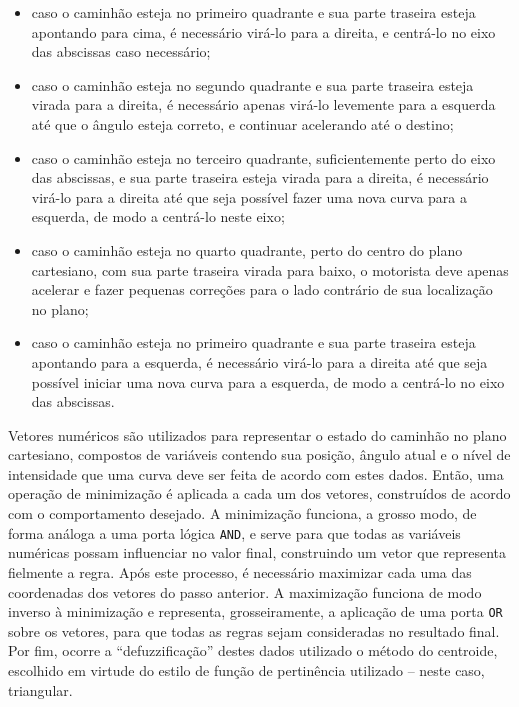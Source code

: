 \documentclass{article}
\begin{document}
\begin{itemize}

    \item caso o caminhão esteja no primeiro quadrante e sua parte traseira
        esteja apontando para cima, é necessário virá-lo para a direita, e
        centrá-lo no eixo das abscissas caso necessário;

    \item caso o caminhão esteja no segundo quadrante e sua parte traseira
        esteja virada para a direita, é necessário apenas virá-lo levemente
        para a esquerda até que o ângulo esteja correto, e continuar
        acelerando até o destino;

    \item caso o caminhão esteja no terceiro quadrante, suficientemente perto
        do eixo das abscissas, e sua parte traseira esteja virada para a
        direita, é necessário virá-lo para a direita até que seja possível
        fazer uma nova curva para a esquerda, de modo a centrá-lo neste eixo;

    \item caso o caminhão esteja no quarto quadrante, perto do centro do plano
        cartesiano, com sua parte traseira virada para baixo, o motorista
        deve apenas acelerar e fazer pequenas correções para o lado contrário
        de sua localização no plano;

    \item caso o caminhão esteja no primeiro quadrante e sua parte traseira
        esteja apontando para a esquerda, é necessário virá-lo para a direita
        até que seja possível iniciar uma nova curva para a esquerda, de
        modo a centrá-lo no eixo das abscissas.

\end{itemize}

Vetores numéricos são utilizados para representar o estado do caminhão no
plano cartesiano, compostos de variáveis contendo sua posição, ângulo atual
e o nível de intensidade que uma curva deve ser feita de acordo com estes
dados. Então, uma operação de minimização é aplicada a cada um dos vetores,
construídos de acordo com o comportamento desejado. A minimização funciona,
a grosso modo, de forma análoga a uma porta lógica \texttt{AND}, e serve para
que todas as variáveis numéricas possam influenciar no valor final,
construindo um vetor que representa fielmente a regra. Após este processo, é
necessário maximizar cada uma das coordenadas dos vetores do passo anterior.
A maximização funciona de modo inverso à minimização e representa,
grosseiramente, a aplicação de uma porta \texttt{OR} sobre os vetores, para
que todas as regras sejam consideradas no resultado final. Por fim, ocorre a
``defuzzificação'' destes dados utilizado o método do centroide, escolhido em
virtude do estilo de função de pertinência utilizado -- neste caso,
triangular. \medskip
\end{document}
